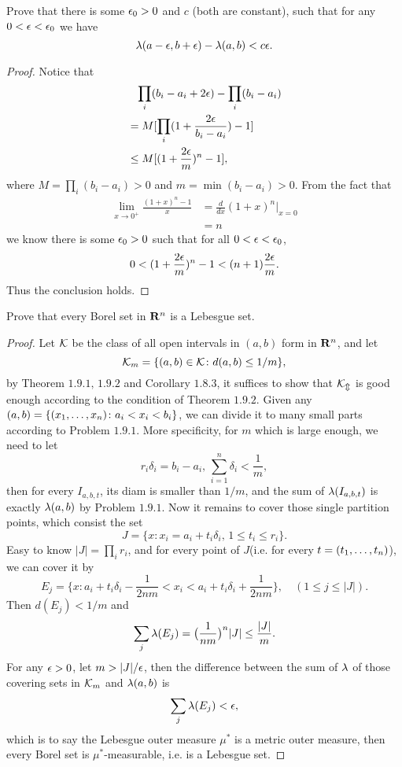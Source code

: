 \begin{pro}%
	Prove that there is some $\epsilon_0>0$ and $c$ (both are constant), such that for any $0<\epsilon<\epsilon_0$ we have
	\[\lambda(a-\epsilon,b+\epsilon)-\lambda(a,b)<c\epsilon.\]
\end{pro}
\begin{proof}
	Notice that
	\begin{align*}
		&\phantom{=}\prod_{i} (b_i-a_i+2\epsilon)-\prod_{i}(b_i-a_i)\\
		&=M[\prod_{i}(1+\frac{2\epsilon}{b_i-a_i})-1]\\
		&\leq M[(1+\frac{2\epsilon}{m})^n-1],
	\end{align*}
	where $M=\prod_i (b_i-a_i)>0$ and $m=\min(b_i-a_i)>0$. From the fact that
	\begin{align*}
		\lim_{x\to 0^+}\frac{(1+x)^n-1}{x}&=\frac{d}{dx}(1+x)^n\bigg|_{x=0}\\
		&=n
	\end{align*}
	we know there is some $\epsilon_0>0$ such that for all $0<\epsilon<\epsilon_0$, \[0<(1+\frac{2\epsilon}{m})^n-1<(n+1)\frac{2\epsilon}m.\]
	Thus the conclusion holds.
\end{proof}

\begin{pro}%
	Prove that every Borel set in $\mathbf{R}^n$ is a Lebesgue set.
\end{pro}
\begin{proof}
	Let $\mathcal{K}$ be the class of all open intervals in $(a,b)$ form in $\mathbf{R}^n$, and let
	\[\mathcal{K}_m=\{(a,b)\in \mathcal{K}\colon d(a,b)\leq 1/m\},\]
	by Theorem $1.9.1,\,1.9.2$ and Corollary $1.8.3$, it suffices to show that $\mathcal{K_m}$ is good enough according to the condition of Theorem $1.9.2$.
	Given any $(a,b)=\{(x_1,\ldots,x_n)\colon a_i<x_i<b_i\}$, we can divide it to many small parts according to Problem $1.9.1$. More specificity, for $m$ which is large enough, we need to let
	\[r_i\delta_i=b_i-a_i,\, \sum_{i=1}^n \delta_i<\frac{1}{m},\]
	then for every $I_{a,b,t}$, its diam is smaller than $1/m$, and the sum of  $\lambda(I_{a,b,t})$ is exactly $\lambda(a,b)$ by Problem $1.9.1$. 
	Now it remains to cover those single partition points, which consist the set
	\[J=\{x\colon x_i=a_i+t_i\delta_i,\,1\leq t_i\leq r_i\}.\]
	Easy to know $|J|=\prod_{i} r_i$, and for every point of $J$(i.e. for every $t=(t_1,\ldots,t_n)$), we can cover it by
	\[E_j=\{x\colon a_i+t_i\delta_i-\frac{1}{2nm}<x_i<a_i+t_i\delta_i+\frac{1}{2nm}\},\quad(1\leq j\leq |J|).\]
	Then $d(E_j)<1/m$ and
	\[\sum_j\lambda(E_j)=\big(\frac{1}{nm}\big)^n|J|\leq \frac{|J|}{m}.\]
	For any $\epsilon>0$, let $m>|J|/\epsilon$, then the difference between the sum of $\lambda$ of those covering sets in $\mathcal{K}_m$ and $\lambda(a,b)$ is 
	\[\sum_{j}\lambda(E_j)<\epsilon,\]
	which is to say the Lebesgue outer measure $\mu^*$ is a metric outer measure, then every Borel set is $\mu^*$-measurable, i.e. is a Lebesgue set.
\end{proof}

